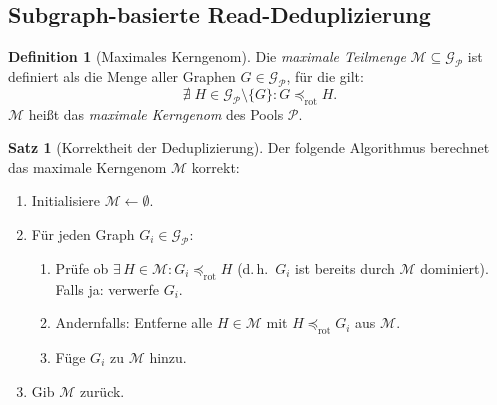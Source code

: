 ﻿\documentclass[a4paper,12pt]{article}
\theoremstyle{definition}
\newtheorem{definition}{Definition}
\newtheorem{satz}{Satz}
\begin{document}
\subsection{Subgraph-basierte Read-Deduplizierung}

\begin{definition}[Maximales Kerngenom]
	\label{def:kerngenom}
	Die \textit{maximale Teilmenge} $\mathcal{M} \subseteq \mathcal{G}_{\mathcal{P}}$
	ist definiert als die Menge aller Graphen $G \in \mathcal{G}_{\mathcal{P}}$,
	für die gilt:
	\[
	\nexists\; H \in \mathcal{G}_{\mathcal{P}} \setminus \{G\}\colon
	G \preceq_{\mathrm{rot}} H.
	\]
	$\mathcal{M}$ heißt das \emph{maximale Kerngenom} des Pools $\mathcal{P}$.
\end{definition}

\begin{satz}[Korrektheit der Deduplizierung]
	\label{satz:dedup_korrektheit}
	Der folgende Algorithmus berechnet das maximale Kerngenom $\mathcal{M}$
	korrekt:
	\begin{enumerate}
		\item Initialisiere $\mathcal{M} \leftarrow \emptyset$.
		\item Für jeden Graph $G_i \in \mathcal{G}_{\mathcal{P}}$:
		\begin{enumerate}
			\item Prüfe ob $\exists\, H \in \mathcal{M}\colon
			G_i \preceq_{\mathrm{rot}} H$ (d.\,h.\ $G_i$ ist
			bereits durch $\mathcal{M}$ dominiert).
			Falls ja: verwerfe $G_i$.
			\item Andernfalls: Entferne alle $H \in \mathcal{M}$ mit
			$H \preceq_{\mathrm{rot}} G_i$ aus $\mathcal{M}$.
			\item Füge $G_i$ zu $\mathcal{M}$ hinzu.
		\end{enumerate}
		\item Gib $\mathcal{M}$ zurück.
	\end{enumerate}
\end{satz}
\end{document}
